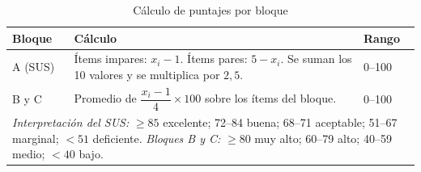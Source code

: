 \begin{table}[htbp]
\centering
\caption{Cálculo de puntajes por bloque}
\label{tab:puntajes}
\begin{tabularx}{\textwidth}{lXl}
\toprule
\textbf{Bloque} & \textbf{Cálculo} & \textbf{Rango} \\
\midrule
A (SUS) & Ítems impares: $x_i - 1$. Ítems pares: $5 - x_i$. Se suman los 10 valores y se multiplica por $2{,}5$. & 0--100 \\
B y C & Promedio de $\dfrac{x_i - 1}{4} \times 100$ sobre los ítems del bloque. & 0--100 \\
\midrule
\multicolumn{3}{p{0.95\textwidth}}{\textit{Interpretación del SUS:} $\geq 85$ excelente; 72--84 buena; 68--71 aceptable; 51--67 marginal; $< 51$ deficiente. \textit{Bloques B y C:} $\geq 80$ muy alto; 60--79 alto; 40--59 medio; $< 40$ bajo.} \\
\bottomrule
\end{tabularx}
\end{table}

% 
